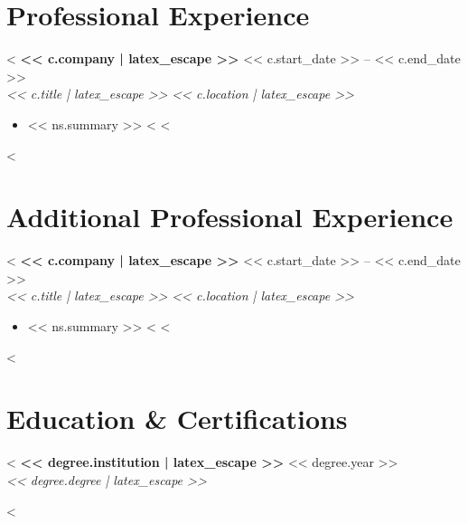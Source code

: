 \documentclass[letterpaper,11pt]{article}
\newcommand{\sectionheader}[1]{\section*{#1}}
\newcommand{\jobentry}[4]{\textbf{#1} \hfill #2 \\ \textit{#3} \hfill \textit{#4}}
\begin{document}
\sectionheader{Professional Experience}

<%
\jobentry{<< c.company | latex_escape >>}{<< c.start_date >> -- << c.end_date >>}{<< c.title | latex_escape >>}{<< c.location | latex_escape >>}

\begin{itemize}[leftmargin=*]
<%
  <%
    <%
    <%
    \item << ns.summary >>
  <%
<%
\end{itemize}

\vspace{5pt}
<%

\sectionheader{Additional Professional Experience}

<%
\jobentry{<< c.company | latex_escape >>}{<< c.start_date >> -- << c.end_date >>}{<< c.title | latex_escape >>}{<< c.location | latex_escape >>}

\begin{itemize}[leftmargin=*]
<%
  <%
    <%
    <%
    \item << ns.summary >>
  <%
<%
\end{itemize}

\vspace{5pt}
<%

\sectionheader{Education \& Certifications}

<%
\textbf{<< degree.institution | latex_escape >>} \hfill << degree.year >> \\
\textit{<< degree.degree | latex_escape >>}

\vspace{5pt}
<%
\end{document}
